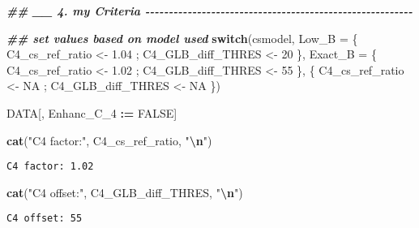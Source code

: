 \documentclass[
  10pt,
  a4paper,oneside]{article}
\newenvironment{Shaded}{\begin{snugshade}}{\end{snugshade}}
\newcommand{\AttributeTok}[1]{\textcolor[rgb]{0.13,0.29,0.53}{#1}}
\newcommand{\ConstantTok}[1]{\textcolor[rgb]{0.56,0.35,0.01}{#1}}
\newcommand{\ControlFlowTok}[1]{\textcolor[rgb]{0.13,0.29,0.53}{\textbf{#1}}}
\newcommand{\DecValTok}[1]{\textcolor[rgb]{0.00,0.00,0.81}{#1}}
\newcommand{\DocumentationTok}[1]{\textcolor[rgb]{0.56,0.35,0.01}{\textbf{\textit{#1}}}}
\newcommand{\FloatTok}[1]{\textcolor[rgb]{0.00,0.00,0.81}{#1}}
\newcommand{\FunctionTok}[1]{\textcolor[rgb]{0.13,0.29,0.53}{\textbf{#1}}}
\newcommand{\NormalTok}[1]{#1}
\newcommand{\OtherTok}[1]{\textcolor[rgb]{0.56,0.35,0.01}{#1}}
\newcommand{\SpecialCharTok}[1]{\textcolor[rgb]{0.81,0.36,0.00}{\textbf{#1}}}
\newcommand{\StringTok}[1]{\textcolor[rgb]{0.31,0.60,0.02}{#1}}
\begin{document}
\begin{Shaded}
\begin{Highlighting}[]
\DocumentationTok{\#\# \_\_ 4. my  Criteria  {-}{-}{-}{-}{-}{-}{-}{-}{-}{-}{-}{-}{-}{-}{-}{-}{-}{-}{-}{-}{-}{-}{-}{-}{-}{-}{-}{-}{-}{-}{-}{-}{-}{-}{-}{-}{-}{-}{-}{-}{-}{-}{-}{-}{-}{-}{-}{-}{-}{-}{-}{-}{-}{-}{-}{-}{-}}

\DocumentationTok{\#\# set values based on model used}
\ControlFlowTok{switch}\NormalTok{(csmodel,}
       \AttributeTok{Low\_B   =}\NormalTok{ \{ C4\_cs\_ref\_ratio }\OtherTok{\textless{}{-}} \FloatTok{1.04}\NormalTok{ ; C4\_GLB\_diff\_THRES }\OtherTok{\textless{}{-}} \DecValTok{20}\NormalTok{ \},}
       \AttributeTok{Exact\_B =}\NormalTok{ \{ C4\_cs\_ref\_ratio }\OtherTok{\textless{}{-}} \FloatTok{1.02}\NormalTok{ ; C4\_GLB\_diff\_THRES }\OtherTok{\textless{}{-}} \DecValTok{55}\NormalTok{ \},}
\NormalTok{                 \{ C4\_cs\_ref\_ratio }\OtherTok{\textless{}{-}}   \ConstantTok{NA}\NormalTok{ ; C4\_GLB\_diff\_THRES }\OtherTok{\textless{}{-}} \ConstantTok{NA}\NormalTok{ \})}

\NormalTok{DATA[, Enhanc\_C\_4 }\SpecialCharTok{:=} \ConstantTok{FALSE}\NormalTok{]}


\FunctionTok{cat}\NormalTok{(}\StringTok{"C4 factor:"}\NormalTok{, C4\_cs\_ref\_ratio,   }\StringTok{"}\SpecialCharTok{\textbackslash{}n}\StringTok{"}\NormalTok{)}
\end{Highlighting}
\end{Shaded}

\begin{verbatim}
C4 factor: 1.02 
\end{verbatim}

\begin{Shaded}
\begin{Highlighting}[]
\FunctionTok{cat}\NormalTok{(}\StringTok{"C4 offset:"}\NormalTok{, C4\_GLB\_diff\_THRES, }\StringTok{"}\SpecialCharTok{\textbackslash{}n}\StringTok{"}\NormalTok{)}
\end{Highlighting}
\end{Shaded}

\begin{verbatim}
C4 offset: 55 
\end{verbatim}
\end{document}
